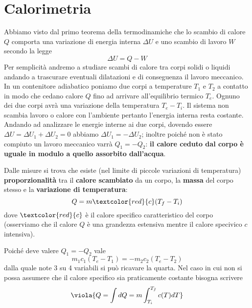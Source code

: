 \section{Calorimetria}
Abbiamo visto dal primo teorema della termodinamiche che lo scambio di calore \(Q\) comporta una variazione di energia interna \(\Delta U\) e uno scambio di lavoro \(W\) secondo la legge
\[ 
\Delta U = Q -W
\]
Per semplicità andremo a studiare scambi di calore tra corpi solidi o liquidi andando a trascurare eventuali dilatazioni e di conseguenza il lavoro meccanico. \\

\noindent
In un contenitore adiabatico poniamo due corpi a temperature \(T_1\) e \(T_2\) a contatto  in modo che cedano calore \(Q\) fino ad arrivare all'equilibrio termico \(T_e\). Ognuno dei due corpi avrà una variazione della temperatura \(T_{e} - T_i\). 
Il sistema non scambia lavoro o calore con l'ambiente pertanto l'energia interna resta costante. Andando ad analizzare le energie interne ai due corpi, dovendo essere \(\Delta U = \Delta U_1 + \Delta U_2 = 0\) abbiamo \(\Delta U_1 = -\Delta U_2\); inoltre poiché non è stato compiuto un lavoro meccanico varrà \(Q_1 = -Q_2\): \textbf{il calore ceduto dal corpo è uguale in modulo a quello assorbito dall'acqua}.


Dalle misure si trova che esiste (nel limite di piccole variazioni di temperatura) \textbf{proporzionalità} tra il \textbf{calore scambiato} da un corpo, la \textbf{massa} del corpo stesso e la \textbf{variazione di temperatura}:
\[ 
Q = m \textcolor{red}{c}(T_f - T_i)
\]
dove \(\textcolor{red}{c}\) è il calore specifico caratteristico del corpo (osserviamo che il calore \(Q\) è una grandezza estensiva mentre il calore specivico \(c\) intensiva).

Poiché deve valere \(Q_1 = -Q_2\) vale
\[ 
m_1 c_1(T_e - T_1) = -m_2 c_2(T_e - T_2)
\]
dalla quale note 3 su 4 variabili si può ricavare la quarta. Nel caso in cui non si possa assumere che il calore specifico sia praticamente costante bisogna scrivere
\begin{equation}
	\viola{Q = \int dQ = m \int_{T_i}^{T_{f}}c(T)dT}
\end{equation}


